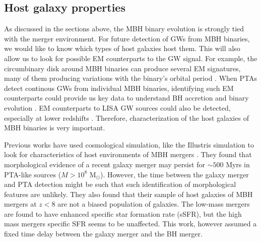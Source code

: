 \documentclass[11pt, letterpaper]{article}
\newcommand{\msun}{M$_{\odot}$}
\begin{document}
\subsection{Host galaxy properties}
\label{sec:host-galaxy-properties}
As discussed in the sections above, the MBH binary evolution is strongly tied with the merger environment. For future detection of GWs from MBH binaries, we would like to know which types of host galaxies host them. This will also allow us to look for possible EM counterparts to the GW signal. For example, the circumbinary disk around MBH binaries can produce several EM signatures, many of them producing variations with the binary's orbital period \citep{dorazio2023,dorazio2018,dorazio2015}. When PTAs detect continous GWs from individual MBH binaries, identifying such EM counterparts could provide us key data to understand BH accretion and binary evolution \citep{Kelley_2018}. EM counterparts to LISA GW sources could also be detected, especially at lower redshifts \cite{Bogdanovic_2022}. Therefore, characterization of the host galaxies of MBH binaries is very important. 

Previous works have used cosmological simulation, like the Illustris simulation to look for characteristics of host environments of MBH mergers \citep{DeGraf_2021}. They found that morphological evidence of a recent galaxy merger may persist for $\sim 500$ Myrs in PTA-like sources ($M > 10^8$ \msun{}). However, the time between the galaxy merger and PTA detection might be such that such identification of morphological features are unlikely. They also found that their sample of host galaxies of MBH mergers at $z<8$ are not a biased population of galaxies. The low-mass mergers are found to have enhanced specific star formation rate (sSFR), but the high mass mergers specific SFR seems to be unaffected. This work, however assumed a fixed time delay between the galaxy merger and the BH merger.
\end{document}
